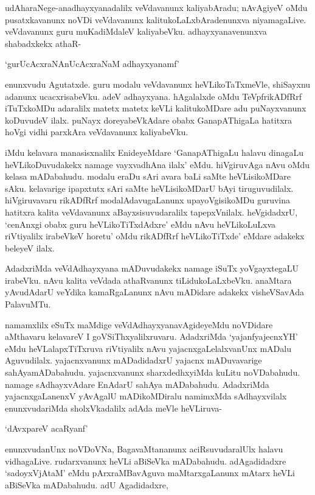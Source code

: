 udAharaNege-anadhayxyanadalilx veVdavanunx kaliyabAradu; nAvAgiyeV oMdu pusatxkavanunx noVDi veVdavanunx kalitukoLaLxbAradenunxva niyamagaLive. veVdavanunx guru muKadiMdaleV kaliyabeVku. adhayxyanavenunxva shabadxkekx athaR- 

\begin{shloka}
`gurUcAcxraNAnUcAcxraNaM adhayxyanamf'
\end{shloka}

\noindent enunxvudu Agutatxde. guru modalu veVdavanunx heVLikoTaTxmeVle, shiSayxnu adanunx ucacxrisabeVku. adeV adhayxyana. hAgalalxde oMdu TeVpfrikADfRrf iTuTxkoMDu adaralilx matetx matetx keVLi kalitukoMDare adu puNayxvanunx koDuvudeV ilalx. puNayx doreyabeVkAdare obabx GanapAThigaLa hatitxra hoVgi vidhi parxkAra veVdavanunx kaliyabeVku.

iMdu kelavara manasisxnalilx EnideyeMdare `GanapAThigaLu halavu dinagaLu heVLikoDuvudakekx namage vayxvadhAna ilalx' eMdu. hiVgiruvAga nAvu oMdu kelasa mADabahudu. modalu eraDu sAri avara baLi saMte heVLisikoMDare sAku. kelavarige ipapxtutx sAri saMte heVLisikoMDarU bAyi tiruguvudilalx. hiVgiruvavaru rikADfRrf modalAdavugaLanunx upayoVgisikoMDu guruvina hatitxra kalita veVdavanunx aBayxsisuvudaralilx tapepxVnilalx. heVgidadxrU, `cenAnxgi obabx guru heVLikoTiTxdAdxre' eMdu nAvu heVLikoLuLxva riVtiyalilx irabeVkeV horetu' oMdu rikADfRrf heVLikoTiTxde' eMdare adakekx beleyeV ilalx.

AdadxriMda veVdAdhayxyana mADuvudakekx namage iSuTx yoVgayxtegaLU irabeVku. nAvu kalita veVdada athaRvanunx tiLidukoLaLxbeVku. anaMtara yAvudAdarU veYdika kamaRgaLanunx nAvu mADidare adakekx visheVSavAda PalavuMTu.

namamxlilx eSuTx maMdige veVdAdhayxyanavAgideyeMdu noVDidare aMthavaru kelavareV I goVSiThxyalilxruvaru. AdadxriMda `yajanfyajecnxYH' eMdu heVLalapxTiTxruva riVtiyalilx nAvu yajacnxgaLelalxvanUnx mADalu Aguvudilalx. yajacnxvanunx mADadidadxrU yajacnx mADuvavarige sahAyamADabahudu. yajacnxvanunx sharxdedhxyiMda kuLitu noVDabahudu. namage sAdhayxvAdare EnAdarU sahAya mADabahudu. AdadxriMda yajacnxgaLanenxV yAvAgalU mADikoMDiralu namimxMda sAdhayxvilalx enunxvudariMda sholxVkadalilx adAda meVle heVLiruva-

`dAvxpareV acaRyanf'

enunxvudanUnx noVDoVNa, BagavaMtananunx aciRsuvudaralUlx halavu vidhagaLive. rudarxvanunx heVLi aBiSeVka mADabahudu. adAgadidadxre `sadoyxVjAtaM' eMdu pArxraMBavAguva maMtarxgaLanunx mAtarx heVLi aBiSeVka mADabahudu. adU Agadidadxre,

